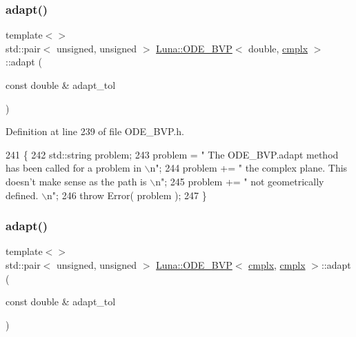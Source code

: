 \subsubsection{\texorpdfstring{adapt()}{adapt()}\hspace{0.1cm}{\footnotesize\ttfamily [2/3]}}
{\footnotesize\ttfamily template$<$$>$ \\
std\+::pair$<$ unsigned, unsigned $>$ \hyperlink{classLuna_1_1ODE__BVP}{Luna\+::\+O\+D\+E\+\_\+\+B\+VP}$<$ double, \hyperlink{namespaceLuna_af3257e90072a78a8ffb16a16773aa18e}{cmplx} $>$\+::adapt (\begin{DoxyParamCaption}\item[{const double \&}]{adapt\+\_\+tol }\end{DoxyParamCaption})}



Definition at line 239 of file O\+D\+E\+\_\+\+B\+V\+P.\+h.


\begin{DoxyCode}
241   \{
242     std::string problem;
243     problem = \textcolor{stringliteral}{" The ODE\_BVP.adapt method has been called for a problem in \(\backslash\)n"};
244     problem += \textcolor{stringliteral}{" the complex plane. This doesn't make sense as the path is \(\backslash\)n"};
245     problem += \textcolor{stringliteral}{" not geometrically defined. \(\backslash\)n"};
246     \textcolor{keywordflow}{throw} Error( problem );
247   \}
\end{DoxyCode}
\mbox{\label{classLuna_1_1ODE__BVP_a59d055c7eb9058184aa86d5514d615e5}} 
\subsubsection{\texorpdfstring{adapt()}{adapt()}\hspace{0.1cm}{\footnotesize\ttfamily [3/3]}}
{\footnotesize\ttfamily template$<$$>$ \\
std\+::pair$<$ unsigned, unsigned $>$ \hyperlink{classLuna_1_1ODE__BVP}{Luna\+::\+O\+D\+E\+\_\+\+B\+VP}$<$ \hyperlink{namespaceLuna_af3257e90072a78a8ffb16a16773aa18e}{cmplx}, \hyperlink{namespaceLuna_af3257e90072a78a8ffb16a16773aa18e}{cmplx} $>$\+::adapt (\begin{DoxyParamCaption}\item[{const double \&}]{adapt\+\_\+tol }\end{DoxyParamCaption})}



